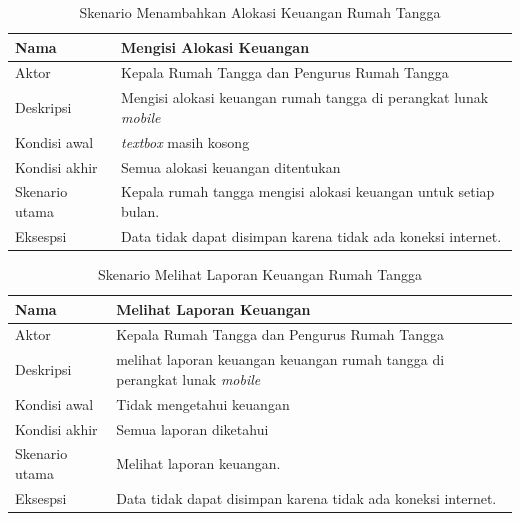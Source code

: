 \begin{table}[H]
	\centering
		\begin{tabular}{ |p{2cm}|p{10cm}| }
			\hline
			Nama &  Mengisi Alokasi Keuangan\\ \hline
			Aktor & Kepala Rumah Tangga dan Pengurus Rumah Tangga \\ \hline
			Deskripsi & Mengisi alokasi keuangan rumah tangga di perangkat lunak \textit{mobile} \\ \hline
			Kondisi awal & \textit{textbox} masih kosong  \\ \hline
			Kondisi akhir & Semua alokasi keuangan ditentukan \\ \hline
			Skenario utama & Kepala rumah tangga mengisi alokasi keuangan untuk setiap bulan. \\ \hline
			Eksespsi & Data tidak dapat disimpan karena tidak ada koneksi internet.  \\ 
			\hline
		\end{tabular}
	\caption{Skenario Menambahkan Alokasi Keuangan Rumah Tangga}
	\label{tab:mendaftarkeuangan}
\end{table}

\begin{table}[H]
	\centering
		\begin{tabular}{ |p{2cm}|p{10cm}| }
			\hline
			Nama &  Melihat Laporan Keuangan\\ \hline
			Aktor & Kepala Rumah Tangga dan Pengurus Rumah Tangga \\ \hline
			Deskripsi & melihat laporan keuangan keuangan rumah tangga di perangkat lunak \textit{mobile} \\ \hline
			Kondisi awal & Tidak mengetahui keuangan  \\ \hline
			Kondisi akhir & Semua laporan diketahui \\ \hline
			Skenario utama & Melihat laporan keuangan. \\ \hline
			Eksespsi & Data tidak dapat disimpan karena tidak ada koneksi internet.  \\ 
			\hline
		\end{tabular}
	\caption{Skenario Melihat Laporan Keuangan Rumah Tangga}
	\label{tab:melihatkeuangan}
\end{table}

